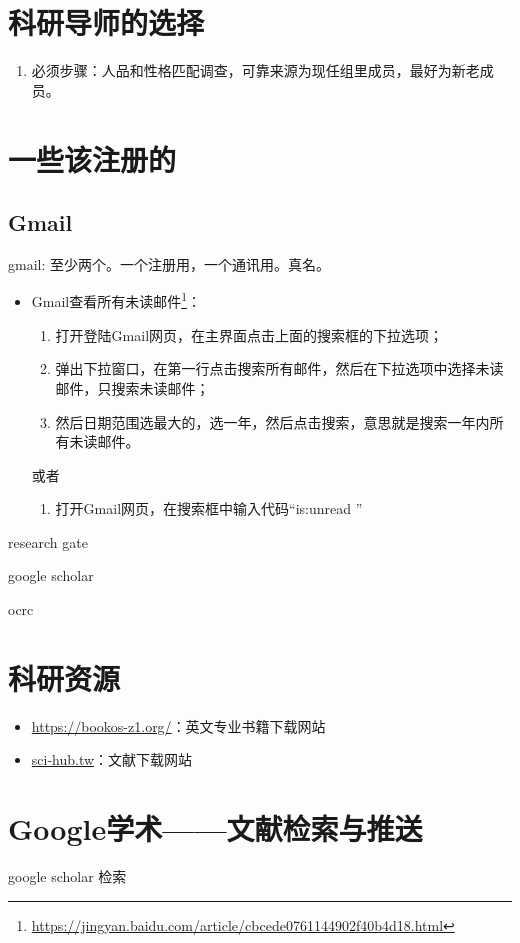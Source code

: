 \section{科研导师的选择}
\begin{enumerate}
\item 必须步骤：人品和性格匹配调查，可靠来源为现任组里成员，最好为新老成员。
\end{enumerate}


\section{一些该注册的}
\subsection{Gmail}
gmail: 至少两个。一个注册用，一个通讯用。真名。

\begin{itemize}
\item Gmail查看所有未读邮件\footnote{\url{https://jingyan.baidu.com/article/cbcede0761144902f40b4d18.html}}：
\begin{enumerate}
\item 打开登陆Gmail网页，在主界面点击上面的搜索框的下拉选项；
\item 弹出下拉窗口，在第一行点击搜索所有邮件，然后在下拉选项中选择未读邮件，只搜索未读邮件；
\item 然后日期范围选最大的，选一年，然后点击搜索，意思就是搜索一年内所有未读邮件。
\end{enumerate}
或者
\begin{enumerate}
\item 打开Gmail网页，在搜索框中输入代码“is:unread ”
\end{enumerate}
\end{itemize}


research gate

google scholar

ocrc




\section{科研资源}
\begin{itemize}
\item \url{https://bookos-z1.org/}：英文专业书籍下载网站
\item \url{sci-hub.tw}：文献下载网站
\end{itemize}


\section{Google学术——文献检索与推送}
google scholar 检索


